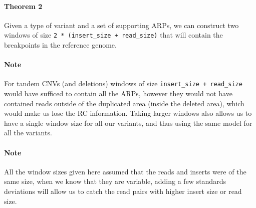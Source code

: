\documentclass{article}
\begin{document}
\paragraph{Theorem 2} Given a type of variant and a set of supporting ARPs, we can construct two windows of size \verb|2 * (insert_size + read_size)| that will contain the breakpoints in the reference genome.

\paragraph{Note} For tandem CNVs (and deletions) windows of size \verb|insert_size + read_size| would have sufficed to contain all the ARPs, however they would not have contained reads outside of the duplicated area (inside the deleted area), which would make us lose the RC information.
Taking larger windows also allows us to have a single window size for all our variants, and thus using the same model for all the variants.

\paragraph{Note} All the window sizes given here assumed that the reads and inserts were of the same size, when we know that they are variable, adding a few standards deviations will allow us to catch the read pairs with higher insert size or read size.
\end{document}
